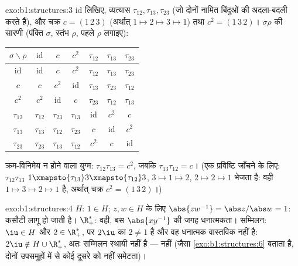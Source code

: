 \begin{solution}{exo:b1:structures:3}
$\mathrm{id}$ लिखिए, व्यत्यास $\tau_{12}, \tau_{13}, \tau_{23}$ (जो दोनों
नामित बिंदुओं की अदला-बदली करते हैं), और चक्र $c = (1\,2\,3)$ (अर्थात् $1
\mapsto 2 \mapsto 3 \mapsto 1$) तथा $c^2 = (1\,3\,2)$। $\sigma\rho$ की सारणी
(पंक्ति $\sigma$, स्तंभ $\rho$, पहले $\rho$ लगाइए):
\begin{center}
\renewcommand{\arraystretch}{1.2}
\begin{tabular}{c|cccccc}
$\sigma\backslash\rho$ & $\mathrm{id}$ & $c$ & $c^2$ & $\tau_{12}$ &
$\tau_{13}$ & $\tau_{23}$ \\ \hline $\mathrm{id}$ & $\mathrm{id}$ & $c$ &
$c^2$ & $\tau_{12}$ & $\tau_{13}$ & $\tau_{23}$ \\ $c$ & $c$ & $c^2$ &
$\mathrm{id}$ & $\tau_{13}$ & $\tau_{23}$ & $\tau_{12}$ \\ $c^2$ & $c^2$ &
$\mathrm{id}$ & $c$ & $\tau_{23}$ & $\tau_{12}$ & $\tau_{13}$ \\ $\tau_{12}$
& $\tau_{12}$ & $\tau_{23}$ & $\tau_{13}$ & $\mathrm{id}$ & $c^2$ & $c$ \\
$\tau_{13}$ & $\tau_{13}$ & $\tau_{12}$ & $\tau_{23}$ & $c$ & $\mathrm{id}$
& $c^2$ \\ $\tau_{23}$ & $\tau_{23}$ & $\tau_{13}$ & $\tau_{12}$ & $c^2$ &
$c$ & $\mathrm{id}$ \\
\end{tabular}
\end{center}
क्रम-विनिमेय न होने वाला युग्म: $\tau_{12}\tau_{13} = c^2$, जबकि
$\tau_{13}\tau_{12} = c$। (एक प्रविष्टि जाँचने के लिए: $\tau_{12}\tau_{13}$
$1 \xmapsto{\tau_{13}} 3 \xmapsto{\tau_{12}} 3$, $3 \mapsto 1 \mapsto 2$, $2
\mapsto 2 \mapsto 1$ भेजता है: वही $1 \mapsto 3 \mapsto 2 \mapsto 1$ है,
अर्थात् चक्र $c^2 = (1\,3\,2)$।)
\end{solution}

\begin{solution}{exo:b1:structures:4}
$H$: $1 \in H$; $z, w \in H$ के लिए $\abs{zw^{-1}} = \abs z / \abs w = 1$:
कसौटी लागू हो जाती है। $\R_+^*$: वही, बस $\abs{xy^{-1}}$ की जगह धनात्मकता।
सम्मिलन: $\iu \in H$ और $2 \in \R_+^*$, पर $2\iu$ का  $2 \neq 1$ है और
वह धनात्मक वास्तविक नहीं है: $2\iu \notin H \cup \R_+^*$, अतः सम्मिलन स्थायी
नहीं है ---  नहीं (जैसा \cref{exo:b1:structures:6} बताता है, दोनों
उपसमूहों में से कोई दूसरे को नहीं समेटता)।
\end{solution}


